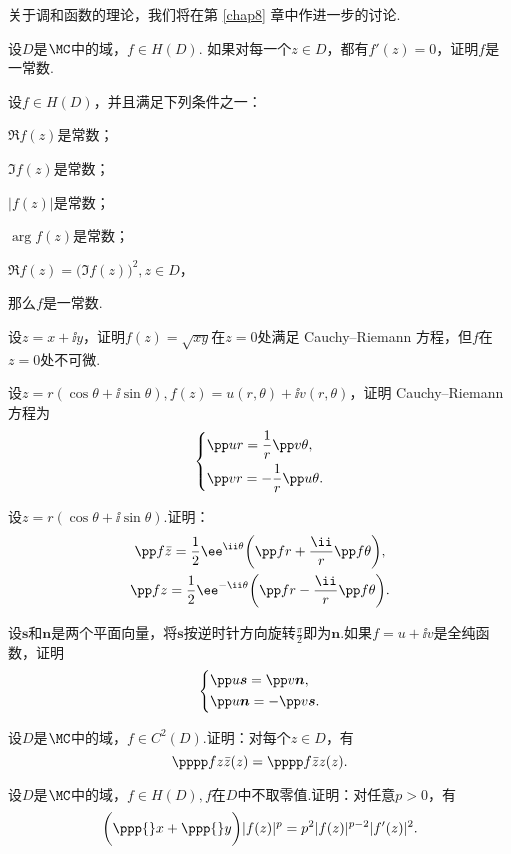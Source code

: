关于调和函数的理论，我们将在第 \ref{chap8} 章中作进一步的讨论.
\begin{xiti}\hypertarget{xiti2.2}{}
\item \hypertarget{xiti2.2.1}{}设$D$是$\MC$中的域，$f\in H(D)$. 如果对每一个$z\in D$，都有$f'(z)=0$，证明$f$是一常数.
\item 设$f\in H(D)$，并且满足下列条件之一：
\begin{enuma}
  \item $\Re f(z)$是常数；
  \item $\Im f(z)$是常数；
  \item $|f(z)|$是常数；
  \item $\arg f(z)$是常数；
  \item $\Re f(z)=\big(\Im f(z)\big)^2,z\in D$，
\end{enuma}
那么$f$是一常数.
\item 设$z=x+\ii y$，证明$f(z)=\sqrt{xy}$在$z=0$处满足 Cauchy--Riemann 方程，但$f$在$z=0$处不可微.
\item \hypertarget{xiti2.2.4}{}设$z=r(\cos\theta+\ii\sin\theta),f(z)=u(r,\theta)+\ii v(r,\theta)$，证明 Cauchy--Riemann 方程为
    \[\left\{\begin{aligned}
      &\pp ur=\frac1r\pp v{\theta},\\
      &\pp vr=-\frac1r\pp u{\theta}.
    \end{aligned}\right.\]
\item 设$z=r(\cos\theta+\ii\sin\theta)$.证明：
\begin{gather*}
  \pp f{\bar z}=\frac12\ee^{\ii\theta}\bigg(\pp fr+\frac{\ii}r\pp f{\theta}\bigg),\\
  \pp fz=\frac12\ee^{-\ii\theta}\bigg(\pp fr-\frac{\ii}r\pp f{\theta}\bigg).
\end{gather*}
\item 设$\boldsymbol s$和$\boldsymbol n$是两个平面向量，将$\boldsymbol s$按逆时针方向旋转$\frac\pi2$即为$\boldsymbol n$.如果$f=u+\ii v$是全纯函数，证明
  \[\left\{\begin{aligned}
  &\pp u{\boldsymbol s}=\pp v{\boldsymbol n},\\
  &\pp u{\boldsymbol n}=-\pp v{\boldsymbol s}.
  \end{aligned}\right.\]
\item 设$D$是$\MC$中的域，$f\in C^2(D)$.证明：对每个$z\in D$，有
\[\pppp fz{\bar z}(z)=\pppp f{\bar z}z(z).\]
\item 设$D$是$\MC$中的域，$f\in H(D),f$在$D$中不取零值.证明：对任意$p>0$，有
\[\bigg(\ppp{}x+\ppp{}y\bigg)|f(z)|^p=p^2|f(z)|^{p-2}|f'(z)|^2.\]

\end{xiti}
